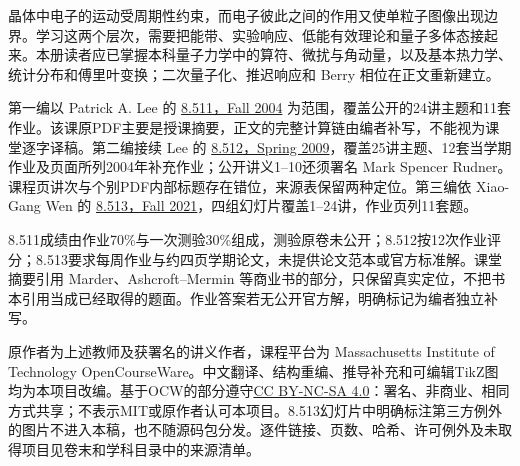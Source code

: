 \originalpreface
晶体中电子的运动受周期性约束，而电子彼此之间的作用又使单粒子图像出现边界。学习这两个层次，需要把能带、实验响应、低能有效理论和量子多体态接起来。本册读者应已掌握本科量子力学中的算符、微扰与角动量，以及基本热力学、统计分布和傅里叶变换；二次量子化、推迟响应和 Berry 相位在正文重新建立。

第一编以 Patrick A. Lee 的 \href{https://ocw.mit.edu/courses/8-511-theory-of-solids-i-fall-2004/}{8.511，Fall 2004} 为范围，覆盖公开的24讲主题和11套作业。该课原PDF主要是授课摘要，正文的完整计算链由编者补写，不能视为课堂逐字译稿。第二编接续 Lee 的 \href{https://ocw.mit.edu/courses/8-512-theory-of-solids-ii-spring-2009/}{8.512，Spring 2009}，覆盖25讲主题、12套当学期作业及页面所列2004年补充作业；公开讲义1--10还须署名 Mark Spencer Rudner。课程页讲次与个别PDF内部标题存在错位，来源表保留两种定位。第三编依 Xiao-Gang Wen 的 \href{https://ocw.mit.edu/courses/8-513-modern-quantum-many-body-physics-for-condensed-matter-systems-fall-2021/}{8.513，Fall 2021}，四组幻灯片覆盖1--24讲，作业页列11套题。

8.511成绩由作业70\%与一次测验30\%组成，测验原卷未公开；8.512按12次作业评分；8.513要求每周作业与约四页学期论文，未提供论文范本或官方标准解。课堂摘要引用 Marder、Ashcroft--Mermin 等商业书的部分，只保留真实定位，不把书本引用当成已经取得的题面。作业答案若无公开官方解，明确标记为编者独立补写。

原作者为上述教师及获署名的讲义作者，课程平台为 Massachusetts Institute of Technology OpenCourseWare。中文翻译、结构重编、推导补充和可编辑TikZ图均为本项目改编。基于OCW的部分遵守\href{https://creativecommons.org/licenses/by-nc-sa/4.0/}{CC BY-NC-SA 4.0}：署名、非商业、相同方式共享；不表示MIT或原作者认可本项目。8.513幻灯片中明确标注第三方例外的图片不进入本稿，也不随源码包分发。逐件链接、页数、哈希、许可例外及未取得项目见卷末和学科目录中的来源清单。
